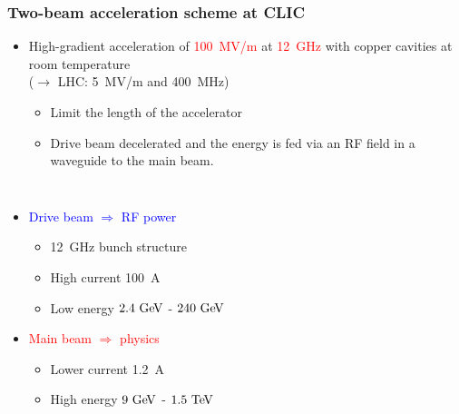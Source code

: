 {
  \begin{frame}
    \frametitle{Two-beam acceleration scheme at CLIC}
    
    \vspace{-1cm}
    \begin{itemize}
    \item High-gradient acceleration of \textcolor{Red}{100~MV/m} at
      \textcolor{Red}{12~GHz} with copper cavities at room temperature\\
      ($\rightarrow$ LHC: 5~MV/m and 400~MHz)
      \begin{itemize}
      \item Limit the length of the accelerator
      \item Drive beam decelerated and the energy is fed via an RF
        field in a waveguide to the main beam.
      \end{itemize}
    \end{itemize}
    
    \vspace{-0.3cm}
    \begin{columns}
      \begin{itemize}
      \item \textcolor{blue}{Drive beam $\Rightarrow$ RF power}
        \begin{itemize}
        \item 12~GHz bunch structure
        \item High current 100~A
        \item Low energy $2.4\,\mathrm{\,Ge\kern -0.1em V}$ - $240\,\mathrm{\,Ge\kern -0.1em V}$
        \end{itemize}
      \item \textcolor{red}{Main beam $\Rightarrow$ physics}
        \begin{itemize}
        \item Lower current 1.2~A
        \item High energy $9\,\mathrm{\,Ge\kern -0.1em V}$ - $1.5\,\mathrm{\,Te\kern -0.1em V}$
        \end{itemize}
      \end{itemize}
    \end{columns}

  \end{frame}
}


